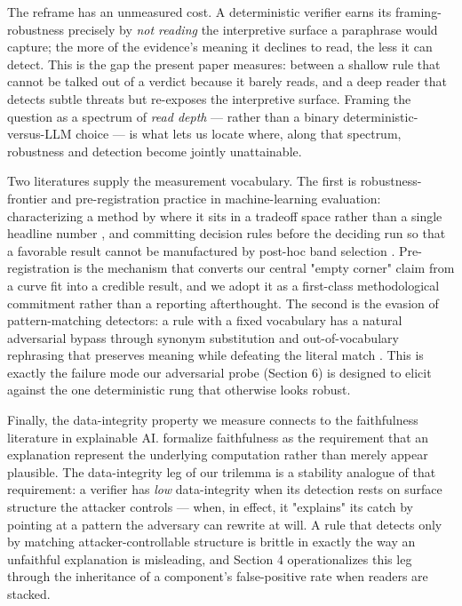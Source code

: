 \documentclass[sigconf,anonymous,review]{acmart}
\begin{document}
The reframe has an unmeasured cost. A deterministic verifier earns its framing-robustness precisely by \textit{not reading} the interpretive surface a paraphrase would capture; the more of the evidence's meaning it declines to read, the less it can detect. This is the gap the present paper measures: between a shallow rule that cannot be talked out of a verdict because it barely reads, and a deep reader that detects subtle threats but re-exposes the interpretive surface. Framing the question as a spectrum of \textit{read depth} --- rather than a binary deterministic-versus-LLM choice --- is what lets us locate where, along that spectrum, robustness and detection become jointly unattainable.

Two literatures supply the measurement vocabulary. The first is robustness-frontier and pre-registration practice in machine-learning evaluation: characterizing a method by where it sits in a tradeoff space rather than a single headline number \citep{tsipras-2019}, and committing decision rules before the deciding run so that a favorable result cannot be manufactured by post-hoc band selection \citep{albanie-2022}. Pre-registration is the mechanism that converts our central "empty corner" claim from a curve fit into a credible result, and we adopt it as a first-class methodological commitment rather than a reporting afterthought. The second is the evasion of pattern-matching detectors: a rule with a fixed vocabulary has a natural adversarial bypass through synonym substitution and out-of-vocabulary rephrasing that preserves meaning while defeating the literal match \citep{jin-2020}. This is exactly the failure mode our adversarial probe (Section 6) is designed to elicit against the one deterministic rung that otherwise looks robust.

Finally, the data-integrity property we measure connects to the faithfulness literature in explainable AI. \citet{jacovi-goldberg-2020} formalize faithfulness as the requirement that an explanation represent the underlying computation rather than merely appear plausible. The data-integrity leg of our trilemma is a stability analogue of that requirement: a verifier has \textit{low} data-integrity when its detection rests on surface structure the attacker controls --- when, in effect, it "explains" its catch by pointing at a pattern the adversary can rewrite at will. A rule that detects only by matching attacker-controllable structure is brittle in exactly the way an unfaithful explanation is misleading, and Section 4 operationalizes this leg through the inheritance of a component's false-positive rate when readers are stacked.
\end{document}
